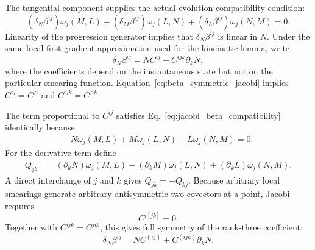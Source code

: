 \documentclass[11pt]{article}
\begin{document}
The tangential component supplies the actual evolution compatibility condition:
\begin{equation}
\boxed{
(\delta_N\beta^{ij})\omega_j(M,L)
+(\delta_M\beta^{ij})\omega_j(L,N)
+(\delta_L\beta^{ij})\omega_j(N,M)=0.}
\label{eq:jacobi_beta_compatibility}
\end{equation}
Linearity of the progression generator implies that $\delta_N\beta^{ij}$ is linear in $N$. Under the same local first-gradient approximation used for the kinematic lemma, write
\begin{equation}
    \delta_N\beta^{ij}
    =NC^{ij}+C^{ijk}\partial_kN,
    \label{eq:beta_response_general}
\end{equation}
where the coefficients depend on the instantaneous state but not on the particular smearing function. Equation~\eqref{eq:beta_symmetric_jacobi} implies $C^{ij}=C^{ji}$ and $C^{ijk}=C^{jik}$.

The term proportional to $C^{ij}$ satisfies Eq.~\eqref{eq:jacobi_beta_compatibility} identically because
\begin{equation}
\begin{split}
&N\omega_j(M,L)+M\omega_j(L,N)+L\omega_j(N,M)=0.
\end{split}
\label{eq:cyclic_omega_identity}
\end{equation}
For the derivative term define
\begin{equation}
\begin{split}
Q_{jk}={}&(\partial_kN)\omega_j(M,L)
 +(\partial_kM)\omega_j(L,N)
 +(\partial_kL)\omega_j(N,M).
\end{split}
\label{eq:Q_jk}
\end{equation}
A direct interchange of $j$ and $k$ gives $Q_{jk}=-Q_{kj}$. Because arbitrary local smearings generate arbitrary antisymmetric two-covectors at a point, Jacobi requires
\begin{equation}
    C^{i[jk]}=0.
\end{equation}
Together with $C^{ijk}=C^{jik}$, this gives full symmetry of the rank-three coefficient:
\begin{equation}
    \boxed{
    \delta_N\beta^{ij}
    =NC^{(ij)}+C^{(ijk)}\partial_kN.}
    \label{eq:jacobi_allowed_beta_response}
\end{equation}
\end{document}
